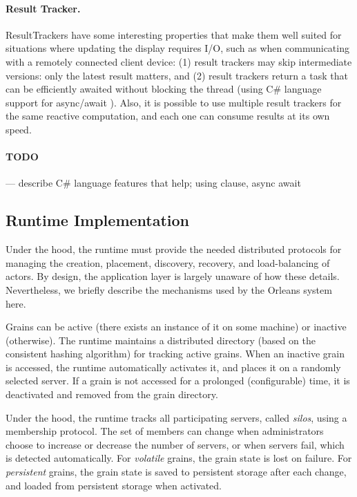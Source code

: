 \paragraph{Result Tracker.}
ResultTrackers have some interesting properties that make them well suited for situations where updating the display requires I/O, such as when communicating with a remotely connected client device:   (1) result trackers may skip intermediate versions: only the latest result matters, and (2) result trackers return a task that can be efficiently awaited without blocking the thread (using C\# language support for async/await \cite{Bierman2012}).  Also, it is possible to use multiple result trackers for the same reactive computation, and each one can consume results at its own speed.

\paragraph{TODO}
--- describe C\# language features that help; using clause, async await




\hidden
{
\subsection{Runtime Implementation}

Under the hood, the runtime must provide the needed distributed protocols for managing the creation, placement, discovery, recovery, and load-balancing of actors. By design, the application layer is largely unaware of how these details. Nevertheless, we briefly describe the mechanisms used by the Orleans system here. 

 Grains can be active (there exists an instance of it on some machine) or inactive (otherwise). The runtime maintains a distributed directory (based on the consistent hashing algorithm)  for tracking active grains. When an inactive grain is accessed, the runtime automatically activates it, and places it on a randomly selected server. If a grain is not accessed for a prolonged (configurable) time, it is deactivated and removed from the grain directory. 

 Under the hood, the runtime tracks all participating servers, called \emph{silos}, using a membership protocol. The set of members can change when administrators choose to increase or decrease the number of servers, or when servers fail, which is detected automatically.  For \emph{volatile} grains, the grain state is lost on failure. For \emph{persistent} grains, the grain state is saved to persistent storage after each change, and loaded from persistent storage when activated. 
 }